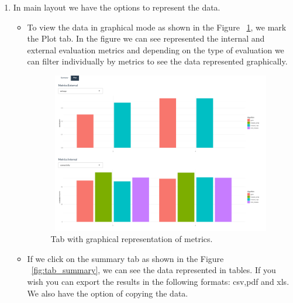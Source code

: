 \begin{enumerate}
\begin{itemize}
Note: The variables in the data set can be translated into whole numbers. As we have worked with the basketball dataset throughout the paper, the dataset contains the following variables: \texttt{assists\_per\_minute, height, time\_played, age, points\_per\_minute}. These variables are translated into whole numbers from left to right, i.e. \texttt{assists\_per\_minute} corresponds to 1, \texttt{height} to 2 and so on. This is ideal, when instead of showing the numerical values of the metrics we need to see the variables of the set.
\end{itemize}
  \item In main layout we have the options to represent the data.
  \begin{itemize}

    \item To view the data in graphical mode as shown in the Figure ~\ref{fig:tab_graph}, we mark the Plot tab. In the figure we can see represented the internal and external evaluation metrics and depending on the type of evaluation we can filter individually by metrics to see the data represented graphically.

  \begin{figure}[htbp]
    \centering
     \includegraphics[width=14cm, height=7cm]{img/tab_graph}
      \caption{Tab with graphical representation of metrics.}
      \label{fig:tab_graph}
  \end{figure}

    \item If we click on the summary tab as shown in the Figure ~\ref{fig:tab_summary}, we can see the data represented in tables. If you wish you can export the results in the following formats: csv,pdf and xls. We also have the option of copying the data.


\end{itemize}
\end{enumerate}
